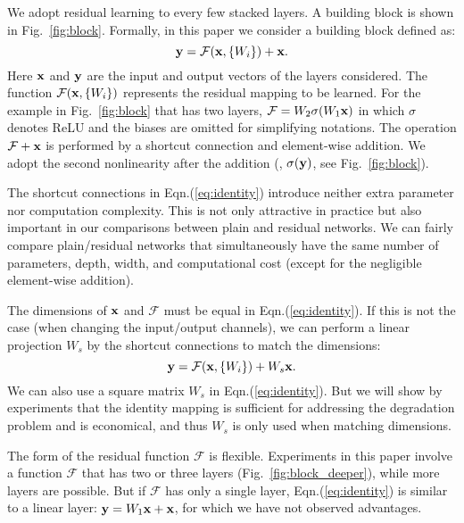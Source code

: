 We adopt residual learning to every few stacked layers.
A building block is shown in Fig.~\ref{fig:block}. Formally, in this paper we consider a building block defined as:
\begin{equation}\label{eq:identity}
\mathbf{y}= \mathcal{F}(\mathbf{x}, \{W_{i}\}) + \mathbf{x}.
\end{equation}
Here $\mathbf{x}$ and $\mathbf{y}$ are the input and output vectors of the layers considered. The function $\mathcal{F}(\mathbf{x}, \{W_{i}\})$ represents the residual mapping to be learned. For the example in Fig.~\ref{fig:block} that has two layers, $\mathcal{F}=W_{2}\sigma(W_{1}\mathbf{x})$ in which $\sigma$ denotes ReLU \cite{Nair2010} and the biases are omitted for simplifying notations. The operation $\mathcal{F}+\mathbf{x}$ is performed by a shortcut connection and element-wise addition. We adopt the second nonlinearity after the addition (\ie, $\sigma(\mathbf{y})$, see Fig.~\ref{fig:block}).

The shortcut connections in Eqn.(\ref{eq:identity}) introduce neither extra parameter nor computation complexity. This is not only attractive in practice but also important in our comparisons between plain and residual networks. We can fairly compare plain/residual networks that simultaneously have the same number of parameters, depth, width, and computational cost (except for the negligible element-wise addition).

The dimensions of $\mathbf{x}$ and $\mathcal{F}$ must be equal in Eqn.(\ref{eq:identity}). If this is not the case (when changing the input/output channels), we can perform a linear projection $W_{s}$ by the shortcut connections to match the dimensions:
\begin{equation}\label{eq:transform}
\mathbf{y}= \mathcal{F}(\mathbf{x}, \{W_{i}\}) + W_{s}\mathbf{x}.
\end{equation}
We can also use a square matrix $W_{s}$ in Eqn.(\ref{eq:identity}). But we will show by experiments that the identity mapping is sufficient for addressing the degradation problem and is economical, and thus $W_{s}$ is only used when matching dimensions.

The form of the residual function $\mathcal{F}$ is flexible. Experiments in this paper involve a function $\mathcal{F}$ that has two or three layers (Fig.~\ref{fig:block_deeper}), while more layers are possible. But if $\mathcal{F}$ has only a single layer, Eqn.(\ref{eq:identity}) is similar to a linear layer: $\mathbf{y}=W_1\mathbf{x}+\mathbf{x}$, for which we have not observed advantages.


